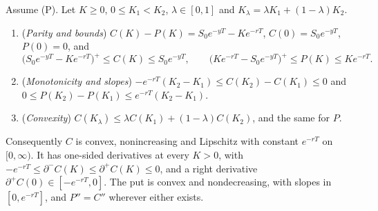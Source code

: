 \begin{proposition}\label{prop:sk-strike-bounds}
Assume (P). Let $K\ge0$, $0\le K_1<K_2$, $\lambda\in[0,1]$ and $K_\lambda=\lambda K_1+(1-\lambda)K_2$.
\begin{enumerate}[label=(\roman*)]
  \item (\emph{Parity and bounds}) $C(K)-P(K)=S_0e^{-yT}-Ke^{-rT}$, $C(0)=S_0e^{-yT}$, $P(0)=0$, and
    \[
      \big(S_0e^{-yT}-Ke^{-rT}\big)^+\le C(K)\le S_0e^{-yT},\qquad
      \big(Ke^{-rT}-S_0e^{-yT}\big)^+\le P(K)\le Ke^{-rT}.
    \]
  \item (\emph{Monotonicity and slopes})
    $-e^{-rT}(K_2-K_1)\le C(K_2)-C(K_1)\le0$ and $0\le P(K_2)-P(K_1)\le e^{-rT}(K_2-K_1)$.
  \item (\emph{Convexity}) $C(K_\lambda)\le\lambda C(K_1)+(1-\lambda)C(K_2)$, and the same for $P$.
\end{enumerate}
Consequently $C$ is convex, nonincreasing and Lipschitz with constant $e^{-rT}$ on $[0,\infty)$.
It has one-sided derivatives at every $K>0$, with
$-e^{-rT}\le\partial^-C(K)\le\partial^+C(K)\le0$, and a right derivative $\partial^+C(0)\in[-e^{-rT},0]$.
The put is convex and nondecreasing, with slopes in $[0,e^{-rT}]$, and $P''=C''$ wherever either exists.
\end{proposition}

